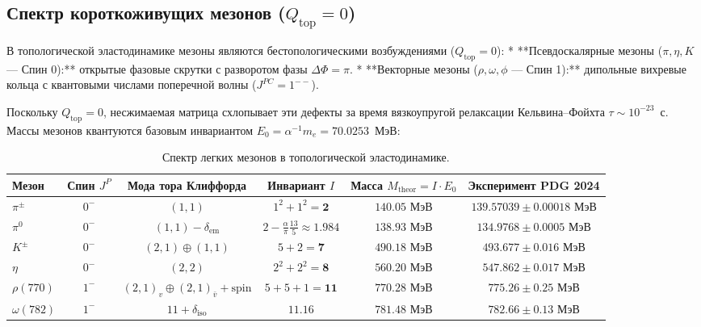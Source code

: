\documentclass[11pt,a4paper,oneside]{article}
\theoremstyle{plain}
\theoremstyle{definition}
\theoremstyle{remark}
\numberwithin{equation}{section}
\begin{document}
	\subsection{Спектр короткоживущих мезонов ($Q_{\text{top}} = 0$)}
	
	В топологической эластодинамике мезоны являются бестопологическими возбуждениями ($Q_{\text{top}} = 0$):
	* **Псевдоскалярные мезоны ($\pi, \eta, K$ — Спин 0):** открытые фазовые скрутки с разворотом фазы $\Delta\Phi = \pi$.
	* **Векторные мезоны ($\rho, \omega, \phi$ — Спин 1):** дипольные вихревые кольца с квантовыми числами поперечной волны ($J^{PC} = 1^{--}$).
	
	Поскольку $Q_{\text{top}} = 0$, несжимаемая матрица схлопывает эти дефекты за время вязкоупругой релаксации Кельвина--Фойхта $\tau \sim 10^{-23}$~с. Массы мезонов квантуются базовым инвариантом $E_0 = \alpha^{-1} m_e = 70.0253$~МэВ:
	
	\begin{table}[h!]
		\centering
		\small
		\caption{Спектр легких мезонов в топологической эластодинамике.}
		\label{tab:meson_spectrum}
		\begin{tabularx}{\textwidth}{lccccc}
			\toprule
			\textbf{Мезон} & \textbf{Спин $J^P$} & \textbf{Мода тора Клиффорда} & \textbf{Инвариант $I$} & \textbf{Масса $M_{\text{theor}} = I \cdot E_0$} & \textbf{Эксперимент PDG 2024} \\
			\midrule
			$\pi^\pm$ & $0^-$ & $(1,1)$ & $1^2 + 1^2 = \mathbf{2}$ & $\mathbf{140.05 \text{ МэВ}}$ & $139.57039 \pm 0.00018 \text{ МэВ}$ \\
			$\pi^0$   & $0^-$ & $(1,1) - \delta_{\text{em}}$ & $2 - \frac{\alpha}{\pi}\frac{13}{5} \approx \mathbf{1.984}$ & $\mathbf{138.93 \text{ МэВ}}$ & $134.9768 \pm 0.0005 \text{ МэВ}$ \\
			$K^\pm$   & $0^-$ & $(2,1) \oplus (1,1)$ & $5 + 2 = \mathbf{7}$ & $\mathbf{490.18 \text{ МэВ}}$ & $493.677 \pm 0.016 \text{ МэВ}$ \\
			$\eta$    & $0^-$ & $(2,2)$ & $2^2 + 2^2 = \mathbf{8}$ & $\mathbf{560.20 \text{ МэВ}}$ & $547.862 \pm 0.017 \text{ МэВ}$ \\
			$\rho(770)$ & $1^-$ & $(2,1)_v \oplus (2,1)_{\bar{v}} + \text{spin}$ & $5 + 5 + 1 = \mathbf{11}$ & $\mathbf{770.28 \text{ МэВ}}$ & $775.26 \pm 0.25 \text{ МэВ}$ \\
			$\omega(782)$ & $1^-$ & $11 + \delta_{\text{iso}}$ & $11.16$ & $\mathbf{781.48 \text{ МэВ}}$ & $782.66 \pm 0.13 \text{ МэВ}$ \\
			\bottomrule
		\end{tabularx}
	\end{table}
	
\end{document}
